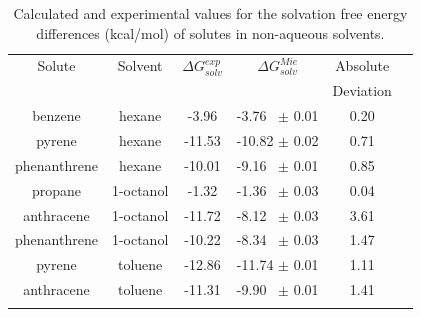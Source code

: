 \begin{table}[h]
\centering
  \caption{Calculated and experimental values for the solvation free energy differences (kcal/mol) of solutes in non-aqueous solvents.}
  \label{tbl:solv1}
  \begin{tabular}{cccccc}
  	\hline\hline
  	Solute       & Solvent   & $\Delta G_{solv}^{exp}$ & $\Delta G_{solv}^{Mie}$ & Absolute  &  \\
  	             &           &                         &                         & Deviation &  \\ \hline\hline
  	benzene      & hexane    & -3.96                   & -3.76  $\,$ $\pm$ 0.01       & 0.20      &  \\
  	pyrene       & hexane    & -11.53                  & -10.82 $\pm$ 0.02       & 0.71      &  \\
  	phenanthrene & hexane    & -10.01                  & -9.16  $\,$ $\pm$ 0.01       & 0.85      &  \\
  	propane      & 1-octanol & -1.32                   & -1.36  $\,$ $\pm$ 0.03       & 0.04      &  \\
  	anthracene   & 1-octanol & -11.72                  & -8.12   $\,$ $\pm$ 0.03       & 3.61      &  \\
  	phenanthrene & 1-octanol & -10.22                  & -8.34  $\,$ $\pm$ 0.03       & 1.47      &  \\
  	pyrene       & toluene   & -12.86                  & -11.74 $\pm$ 0.01       & 1.11      &  \\
  	anthracene   & toluene   & -11.31                  & -9.90 $\,$ $\pm$ 0.01        & 1.41      &  \\ \hline\hline
  	             &
  \end{tabular}
\end{table}
\FloatBarrier

